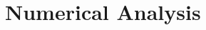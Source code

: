 \documentclass[12pt]{article}
\numberwithin{equation}{section}
\theoremstyle{remark}
\newcommand{\1}{{\rm 1}\kern-0.24em{\rm I}}
\newcommand{\E}{{\rm I}\kern-0.18em{\rm E}}
\begin{document}
\section{Numerical Analysis}\label{sec: numerical}
\end{document}
